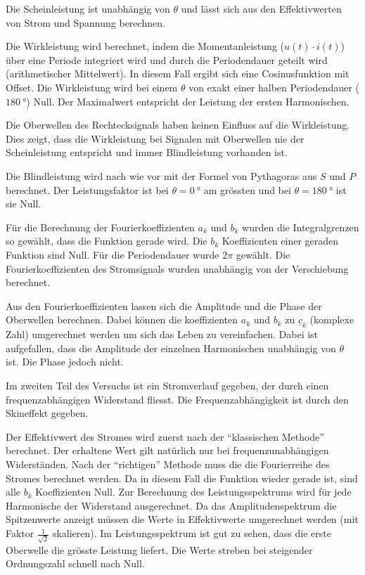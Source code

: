 \documentclass[notitlepage]{fhnwreport/fhnwreport}
\begin{document}
Die Scheinleistung ist  unabh\"angig  von  $\theta$  und  l\"asst  sich  aus den
Effektivwerten  von  Strom  und  Spannung  berechnen.

Die Wirkleistung wird berechnet, indem die Momentanleistung  ($u(t)\cdot  i(t)$)
\"uber eine Periode integriert  wird  und  durch  die Periodendauer geteilt wird
(arithmetischer Mittelwert). In diesem Fall ergibt sich eine Cosinusfunktion mit
Offset.  Die  Wirkleistung  wird  bei  einem $\theta$  von  exakt  einer  halben
Periodendauer  ($\SI{180}{\degree}$)  Null.   Der   Maximalwert  entspricht  der
Leistung der ersten Harmonischen.

Die Oberwellen  des  Rechtecksignals haben keinen Einfluss auf die Wirkleistung.
Dies  zeigt,  dass  die  Wirkleistung  bei   Signalen  mit  Oberwellen  nie  der
Scheinleistung   entspricht    und    immer    Blindleistung    vorhanden   ist.

Die  Blindleistung wird nach wie vor mit der Formel von Pythagoras aus  $S$  und
$P$  berechnet.  Der  Leistungsfaktor  ist   bei   $\theta=\SI{0}{\degree}$   am
gr\"ossten und bei $\theta=\SI{180}{\degree}$ ist sie Null.

F\"ur  die  Berechnung  der  Fourierkoeffizienten  $a_k$  und  $b_k$  wurden die
Integralgrenzen  so  gew\"ahlt,  dass   die  Funktion  gerade  wird.  Die  $b_k$
Koeffizienten  einer  geraden Funktion sind Null. F\"ur die Periodendauer  wurde
$2\pi$ gew\"ahlt. Die Fourierkoeffizienten des Stromsignals wurden  unabh\"angig
von der Verschiebung berechnet.

Aus  den  Fourierkoeffizienten  lassen  sich  die  Amplitude und die  Phase  der
Oberwellen berechnen.  Dabei  k\"onnen  die  koeffizienten  $a_k$  und  $b_k$ zu
$\underline{c}_k$  (komplexe  Zahl)  umgerechnet  werden  um sich das  Leben  zu
vereinfachen.   Dabei  ist  aufgefallen,  dass  die  Amplitude   der   einzelnen
Harmonischen  unabh\"angig  von   $\theta$   ist.   Die   Phase   jedoch  nicht.

Im zweiten  Teil  des  Versuchs  ist  ein  Stromverlauf gegeben, der durch einen
frequenzabh\"angigen  Widerstand fliesst. Die Frequenzabh\"angigkeit  ist  durch
den  Skineffekt  gegeben.

Der Effektivwert des  Stromes  wird  zuerst  nach  der  ``klassischen  Methode''
berechnet. Der erhaltene Wert gilt  nat\"urlich  nur  bei frequenzunabh\"angigen
Widerst\"anden.  Nach der ``richtigen'' Methode muss die  die  Fourierreihe  des
Stromes berechnet werden. Da in diesem Fall die Funktion wieder gerade ist, sind
alle $b_k$ Koeffizienten Null. Zur  Berechnung des Leistungsspektrums wird f\"ur
jede  Harmonische  der Widerstand ausgerechnet. Da  das  Amplitudenspektrum  die
Spitzenwerte anzeigt m\"ussen die Werte in Effektivwerte umgerechnet werden (mit
Faktor $\frac{1}{\sqrt{2}}$ skalieren). Im Leistungsspektrum ist  gut  zu sehen,
dass die erste  Oberwelle  die gr\"osste Leistung liefert. Die Werte streben bei
steigender Ordnungszahl schnell nach Null.
\end{document}
